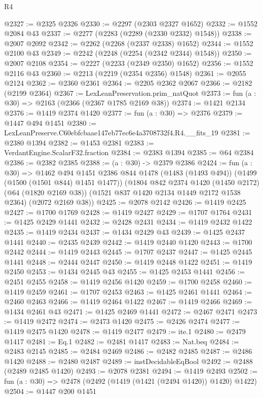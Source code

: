 \begin{lexlean}{R4}
\begin{coremodule}
@2327 := @2325 @2326
@2330 := @2297 (@2303 @2327 @1652)
@2332 := @1552 @2084 @43
@2337 := @2277 (@2283 (@2289 (@2330 @2332) @1548))
@2338 := @2007 @2092
@2342 := @2262 (@2268 (@2337 @2338) @1652)
@2344 := @1552 @2100 @43
@2349 := @2242 (@2248 (@2254 (@2342 @2344) @1548))
@2350 := @2007 @2108
@2354 := @2227 (@2233 (@2349 @2350) @1652)
@2356 := @1552 @2116 @43
@2360 := @2213 (@2219 (@2354 @2356) @1548)
@2361 := @2055 @2124
@2362 := @2360 @2361
@2364 := @2205 @2362 @2067
@2366 := @2182 (@2199 @2364)
@2367 := LexLeanPreservation.prim_natQuot
@2373 := fun (a : @30) => @2163 (@2366 (@2367 @1785 @2169 @38))
@2374 := @1421 @2134
@2376 := @1419 @2374 @1420
@2377 := fun (a : @30) => @2376
@2379 := @1447 @494 @1451
@2380 := LexLeanPreserve.C60ebfcbaae147eb77ec6e4a3708732f4.R4.__fits_19
@2381 := @2380 @1394
@2382 := @1453 @2381
@2383 := VerdantEngine.ScalarF32.fraction
@2384 := @2383 @1394
@2385 := @64 @2384
@2386 := @2382 @2385
@2388 := (a : @30) -> @2379 @2386
@2424 := fun (a : @30) =>
  @1462
    @494
    @1451
    @2386
    @844
    @1478
    (@1483 (@1493 @494))
    (@1499 (@1500 (@1501 @844) @1451 @1477))
    (@1804
      @842
      @2374
      @1420
      (@1450 @2172)
      (@64 (@1820 @2169 @38))
      (@1521 @837 @1420 @2134 @1449 @2172 @1538 @2364)
      (@2072 @2169 @38))
@2425 := @2078 @2142
@2426 := @1419 @2425
@2427 := @1700 @1769
@2428 := @1419 @2427
@2429 := @1707 @1764
@2431 := @1425 @2429 @1441
@2432 := @2428 @2431
@2434 := @1419 @2432 @1422
@2435 := @1419 @2434
@2437 := @1434 @2429 @43
@2439 := @1425 @2437 @1441
@2440 := @2435 @2439
@2442 := @1419 @2440 @1420
@2443 := @1700 @2442
@2444 := @1419 @2443
@2445 := @1707 @2437
@2447 := @1425 @2445 @1441
@2448 := @2444 @2447
@2450 := @1419 @2448 @1422
@2451 := @1419 @2450
@2453 := @1434 @2445 @43
@2455 := @1425 @2453 @1441
@2456 := @2451 @2455
@2458 := @1419 @2456 @1420
@2459 := @1700 @2458
@2460 := @1419 @2459
@2461 := @1707 @2453
@2463 := @1425 @2461 @1441
@2464 := @2460 @2463
@2466 := @1419 @2464 @1422
@2467 := @1419 @2466
@2469 := @1434 @2461 @43
@2471 := @1425 @2469 @1441
@2472 := @2467 @2471
@2473 := @1419 @2472
@2474 := @2473 @1420
@2475 := @2426 @2474
@2477 := @1419 @2475 @1420
@2478 := @1419 @2477
@2479 := ite.{1}
@2480 := @2479 @1417
@2481 := Eq.{1}
@2482 := @2481 @1417
@2483 := Nat.beq
@2484 := @2483 @2145
@2485 := @2484 @2469
@2486 := @2482 @2485
@2487 := @2486 @1420
@2488 := @2480 @2487
@2489 := instDecidableEqBool
@2492 := @2488 (@2489 @2485 @1420)
@2493 := @2078 @2381
@2494 := @1419 @2493
@2502 := fun (a : @30) => @2478 (@2492 (@1419 (@1421 (@2494 @1420)) @1420) @1422)
@2504 := @1447 @200 @1451

\end{coremodule}
\end{lexlean}
